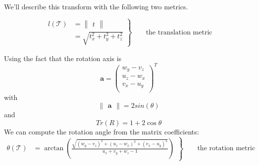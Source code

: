     We'll describe this transform with the following two metrics.
    
    \begin{equation} \label{eq:tf_transl_comp}
        \left.
        \begin{aligned}
        l(\mathcal{T}) &
        =   \begin{Vmatrix}
                t
            \end{Vmatrix} \\
         &
            = \sqrt{t_x^2+t_y^2+t_z^2}
        \end{aligned}
     \right\}
     \qquad \text{the translation metric}
    \end{equation}
    
    Using the fact that the rotation axis is 
    \[
        \mathbf{a}=\begin{pmatrix}
        w_y-v_z \\
        u_z-w_x \\
        v_x-u_y \\
        \end{pmatrix}^T
    \]
    with
    \[
        \begin{Vmatrix}
        \mathbf{a}
        \end{Vmatrix}
        =2sin(\theta)
    \]
    and 
    \[
        Tr(R) = 1 + 2\cos \theta
    \]
    We can compute the rotation angle from the matrix coefficients:
    \begin{equation} \label{eq:tf_rot_comp}
        \left.
        \begin{aligned}
        \theta(\mathcal{T}) &
        = \arctan \left( \frac{\sqrt{(w_y-v_z)^2 + (u_z-w_x)^2 + (v_x-u_y)^2 }}{u_x + v_y + w_z - 1} \right)
        \end{aligned}
     \right\}
     \qquad \text{the rotation metric}
    \end{equation}
